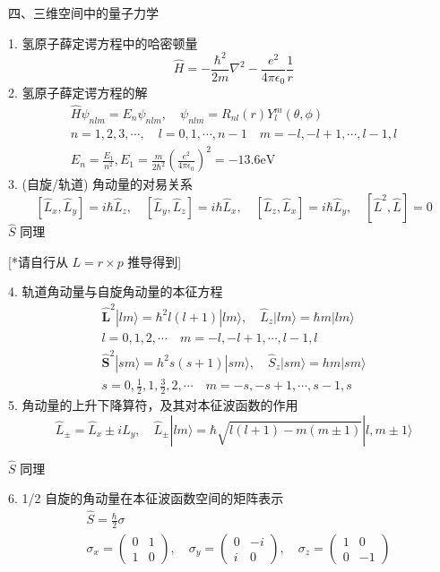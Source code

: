 \documentclass[../../note.tex]{subfiles}
\begin{document}
四、三维空间中的量子力学

1. 氢原子薛定谔方程中的哈密顿量
$$
\hat{H}=-\frac{\hbar^2}{2 m} \nabla^2-\frac{e^2}{4 \pi \epsilon_0} \frac{1}{r}
$$
2. 氢原子薛定谔方程的解
$$
\begin{array}{r}
\hat{H} \psi_{n l m}=E_n \psi_{n l m}, \quad \psi_{n l m}=R_{n l}(r) Y_l^m(\theta, \phi) \\
n=1,2,3, \cdots, \quad l=0,1, \cdots, n-1 \quad m=-l,-l+1, \cdots, l-1, l \\
E_n=\frac{E_1}{n^2}, E_1=\frac{m}{2 \hbar^2}\left(\frac{e^2}{4 \pi \epsilon_0}\right)^2=-13.6 \mathrm{eV}
\end{array}
$$
3. (自旋/轨道) 角动量的对易关系
$$
\left[\hat{L}_x, \hat{L}_y\right]=i \hbar \hat{L}_z, \quad\left[\hat{L}_y, \hat{L}_z\right]=i \hbar \hat{L}_x, \quad\left[\hat{L}_z, \hat{L}_x\right]=i \hbar \hat{L}_y, \quad\left[\hat{L}^2, \hat{L}\right]=0
$$
$\hat{S}$ 同理

[*请自行从 $L=r \times p$ 推导得到]

4. 轨道角动量与自旋角动量的本征方程
$$
\begin{array}{r}
\hat{\boldsymbol{L}}^2|l m\rangle=\hbar^2 l(l+1)|l m\rangle, \quad \hat{L}_z|l m\rangle=\hbar m|l m\rangle \\
l=0,1,2, \cdots \quad m=-l,-l+1, \cdots, l-1, l \\
\hat{\boldsymbol{S}}^2|s m\rangle=h^2 s(s+1)|s m\rangle, \quad \hat{S}_z|s m\rangle=h m|s m\rangle \\
s=0, \frac{1}{2}, 1, \frac{3}{2}, 2, \cdots \quad m=-s,-s+1, \cdots, s-1, s
\end{array}
$$
5. 角动量的上升下降算符，及其对本征波函数的作用
$$
\hat{L}_{ \pm}=\hat{L}_x \pm i L_y, \quad \hat{L}_{ \pm}|l m\rangle=\hbar \sqrt{l(l+1)-m(m \pm 1)}|l, m \pm 1\rangle
$$

$\hat{S}$ 同理

6. 1/2 自旋的角动量在本征波函数空间的矩阵表示
$$
\begin{aligned}
& \hat{S}=\frac{\hbar}{2} \sigma \\
& \sigma_x=\left(\begin{array}{ll}
0 & 1 \\
1 & 0
\end{array}\right), \quad \sigma_y=\left(\begin{array}{cc}
0 & -i \\
i & 0
\end{array}\right), \quad \sigma_z=\left(\begin{array}{cc}
1 & 0 \\
0 & -1
\end{array}\right) \\
&
\end{aligned}
$$
\end{document}
